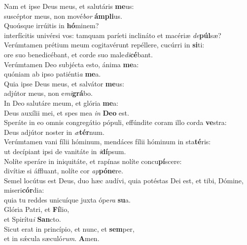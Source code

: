 \evenverse Nam et ipse Deus meus, et salutáris \textbf{me}us:~\*\\
\evenverse suscéptor meus, non mové\textit{bor} \textbf{ám}\textbf{pli}us.\\
\oddverse Quoúsque irrúitis in \textbf{hó}minem?~\*\\
\oddverse interfícitis univérsi vos: tamquam paríeti inclináto et macériæ \textit{de}\textbf{púl}sæ?\\
\evenverse Verúmtamen prétium meum cogitavérunt repéllere, cucúrri in \textbf{si}ti:~\*\\
\evenverse ore suo benedicébant, et corde suo male\textit{di}\textbf{cé}bant.\\
\oddverse Verúmtamen Deo subjécta esto, ánima \textbf{me}a:~\*\\
\oddverse quóniam ab ipso patiénti\textit{a} \textbf{me}a.\\
\evenverse Quia ipse Deus meus, et salvátor \textbf{me}us:~\*\\
\evenverse adjútor meus, non e\textit{mi}\textbf{grá}bo.\\
\oddverse In Deo salutáre meum, et glória \textbf{me}a:~\*\\
\oddverse Deus auxílii mei, et spes mea \textit{in} \textbf{De}\textbf{o} est.\\
\evenverse Speráte in eo omnis congregátio pópuli, effúndite coram illo corda \textbf{ve}stra:~\*\\
\evenverse Deus adjútor noster in \textit{æ}\textbf{tér}num.\\
\oddverse Verúmtamen vani fílii hóminum, mendáces fílii hóminum in sta\textbf{té}ris:~\*\\
\oddverse ut decípiant ipsi de vanitáte in \textit{i}\textbf{dí}psum.\\
\evenverse Nolíte speráre in iniquitáte, et rapínas nolíte concu\textbf{pí}scere:~\*\\
\evenverse divítiæ si áffluant, nolíte cor \textit{ap}\textbf{pó}\textbf{ne}re.\\
\oddverse Semel locútus est Deus, duo hæc audívi, quia potéstas Dei est, et tibi, Dómine, miseri\textbf{cór}dia:~\*\\
\oddverse quia tu reddes unicuíque juxta ópe\textit{ra} \textbf{su}a.\\
\evenverse Glória Patri, et \textbf{Fí}lio,~\*\\
\evenverse et Spirítu\textit{i} \textbf{San}cto.\\
\oddverse Sicut erat in princípio, et nunc, et \textbf{sem}per,~\*\\
\oddverse et in sǽcula sæculó\textit{rum}. \textbf{A}men.\\
